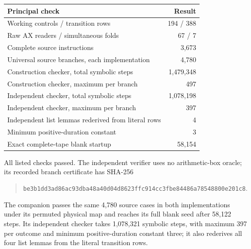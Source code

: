 \begin{center}
\begin{tabular}{@{}lr@{}}
\toprule
Principal check & Result\\
\midrule
Working controls / transition rows &194 / 388\\
Raw AX readers / simultaneous folds &67 / 7\\
Complete source instructions &3,673\\
Universal source branches, each implementation &4,780\\
Construction checker, total symbolic steps &1,479,348\\
Construction checker, maximum per branch &497\\
Independent checker, total symbolic steps &1,078,198\\
Independent checker, maximum per branch &397\\
Independent list lemmas rederived from literal rows &4\\
Minimum positive-duration constant &3\\
Exact complete-tape blank startup &58,154\\
\bottomrule
\end{tabular}
\end{center}
All listed checks passed. The independent verifier uses no arithmetic-box
oracle; its recorded branch certificate has SHA-256
\begin{quote}\small
\nolinkurl{be3b1dd3ad86ac93dba48a40d04d8623ffc914cc3fbe84486a78548800e201c8}.
\end{quote}
The companion passes the same 4,780 source cases in both implementations
under its permuted physical map and reaches its full blank seed after
58,122 steps. Its independent checker takes 1,078,321 symbolic steps,
with maximum 397 per outcome and minimum positive-duration constant three;
it also rederives all four list lemmas from the literal transition rows.
